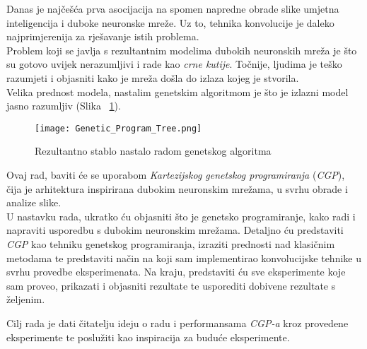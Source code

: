 Danas je najčešća prva asocijacija na spomen napredne obrade slike umjetna inteligencija i duboke neuronske mreže.
Uz to, tehnika konvolucije je daleko najprimjerenija za rješavanje istih problema. \\
Problem koji se javlja s rezultantnim modelima dubokih neuronskih mreža je što su gotovo uvijek nerazumljivi i rade kao \emph{crne kutije}.
Točnije, ljudima je teško razumjeti i objasniti kako je mreža došla do izlaza kojeg je stvorila. \\
Velika prednost modela, nastalim genetskim algoritmom je što je izlazni model jasno razumljiv (Slika ~\ref{fig:gen_alg_tree_1}).

\begin{figure}
	\centering
	\texttt{[image: Genetic\_Program\_Tree.png]}
	\caption{Rezultantno stablo nastalo radom genetskog algoritma}
	\label{fig:gen_alg_tree_1}
\end{figure}

Ovaj rad, baviti će se uporabom \emph{Kartezijskog genetskog programiranja} (\emph{CGP}), čija je arhitektura inspirirana dubokim neuronskim mrežama, u svrhu obrade i analize slike. \\
U nastavku rada, ukratko ću objasniti što je genetsko programiranje, kako radi i napraviti usporedbu s dubokim neuronskim mrežama.
Detaljno ću predstaviti \emph{CGP} kao tehniku genetskog programiranja, izraziti prednosti nad klasičnim metodama te predstaviti način na koji sam implementirao konvolucijske tehnike u svrhu provedbe eksperimenata.
Na kraju, predstaviti ću sve eksperimente koje sam proveo, prikazati i objasniti rezultate te usporediti dobivene rezultate s željenim.

Cilj rada je dati čitatelju ideju o radu i performansama \emph{CGP-a} kroz provedene eksperimente te poslužiti kao inspiracija za buduće eksperimente.
